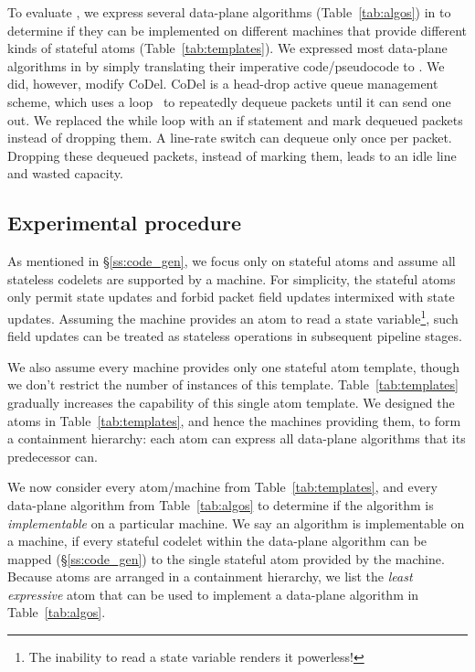To evaluate \pktlanguage, we express several data-plane algorithms
(Table~\ref{tab:algos}) in \pktlanguage to determine if they can be implemented
on different \absmachine machines that provide different kinds of stateful
atoms (Table~\ref{tab:templates}). We expressed most data-plane algorithms in
\pktlanguage by simply translating their imperative code/pseudocode to
\pktlanguage. We did, however, modify CoDel. CoDel is a head-drop active queue
management scheme, which uses a loop~\cite{codel_code} to repeatedly dequeue
packets until it can send one out.  We replaced the while loop with an if
statement and mark dequeued packets instead of dropping them. A line-rate
switch can dequeue only once per packet. Dropping these dequeued packets,
instead of marking them, leads to an idle line and wasted capacity.

\subsection{Experimental procedure}
As mentioned in \S\ref{ss:code_gen}, we focus only on stateful atoms and assume
all stateless codelets are supported by a \absmachine machine. For simplicity,
the stateful atoms only permit state updates and forbid packet field updates
intermixed with state updates.  Assuming the \absmachine machine provides an
atom to read a state variable\footnote{The inability to read a state variable
renders it powerless!}, such field updates can be treated as stateless
operations in subsequent pipeline stages.

We also assume every \absmachine machine provides only one stateful atom
template, though we don't restrict the number of instances of this template.
Table~\ref{tab:templates} gradually increases the capability of this single
atom template.  We designed the atoms in Table~\ref{tab:templates}, and hence
the \absmachine machines providing them, to form a containment hierarchy: each
atom can express all data-plane algorithms that its predecessor can.

We now consider every atom/\absmachine machine from Table~\ref{tab:templates},
and every data-plane algorithm from Table~\ref{tab:algos} to determine if the
algorithm is \textit{implementable} on a particular \absmachine machine. We say
an algorithm is implementable on a \absmachine machine, if every stateful
codelet within the data-plane algorithm can be mapped (\S\ref{ss:code_gen}) to
the single stateful atom provided by the \absmachine machine. Because
atoms are arranged in a containment hierarchy, we list the \textit{least
expressive} atom that can be used to implement a data-plane algorithm in
Table~\ref{tab:algos}.

